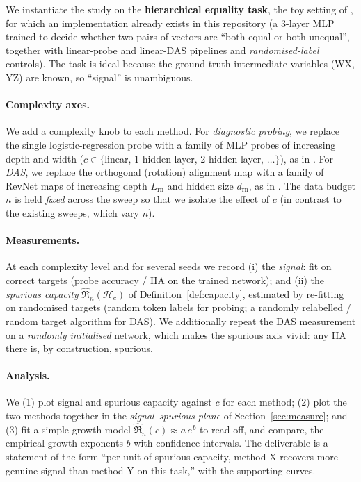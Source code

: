 \documentclass[11pt]{article}
\newcommand{\rade}{\mathfrak{R}}         %
\newcommand{\hypclass}{\mathcal{H}}      %
\newcommand{\complexity}{c}              %
\begin{document}
We instantiate the study on the \textbf{hierarchical equality task}, the toy
setting of \citet{sutter2025nonlinear}, for which an implementation already exists
in this repository (a $3$-layer MLP trained to decide whether two pairs of
vectors are ``both equal or both unequal'', together with linear-probe and
linear-DAS pipelines and \emph{randomised-label} controls). The task is ideal
because the ground-truth intermediate variables (WX, YZ) are
known, so ``signal'' is unambiguous.

\paragraph{Complexity axes.} We add a complexity knob to each method.
For \emph{diagnostic probing}, we replace the single logistic-regression probe with
a family of MLP probes of increasing depth and width
($\complexity \in \{$linear, $1$-hidden-layer, $2$-hidden-layer, $\dots\}$), as in
\citet{pimentel2020information}. For \emph{DAS}, we replace the orthogonal
(rotation) alignment map with a family of RevNet maps of increasing depth
$L_{\mathrm{rn}}$ and hidden size $d_{\mathrm{rn}}$, as in
\citet{sutter2025nonlinear}. The data budget $n$ is held \emph{fixed} across the
sweep so that we isolate the effect of $\complexity$ (in contrast to the existing
sweeps, which vary $n$).

\paragraph{Measurements.} At each complexity level and for several seeds we record
(i) the \emph{signal}: fit on correct targets (probe accuracy / IIA on the trained
network); and (ii) the \emph{spurious capacity}
$\widehat{\rade}_n(\hypclass_{\complexity})$ of Definition~\ref{def:capacity}, estimated
by re-fitting on randomised targets (random token labels for probing; a randomly
relabelled / random target algorithm for DAS). We additionally repeat the DAS
measurement on a \emph{randomly initialised} network, which makes the spurious
axis vivid: any IIA there is, by construction, spurious.

\paragraph{Analysis.} We (1) plot signal and spurious capacity against
$\complexity$ for each method; (2) plot the two methods together in the
\emph{signal--spurious plane} of Section~\ref{sec:measure}; and (3) fit a simple
growth model $\widehat{\rade}_n(\complexity) \approx a\,\complexity^{\,b}$ to
read off, and compare, the empirical growth exponents $b$ with confidence
intervals. The deliverable is a statement of the form ``per unit of spurious
capacity, method X recovers more genuine signal than method Y on this task,'' with
the supporting curves.
\end{document}
